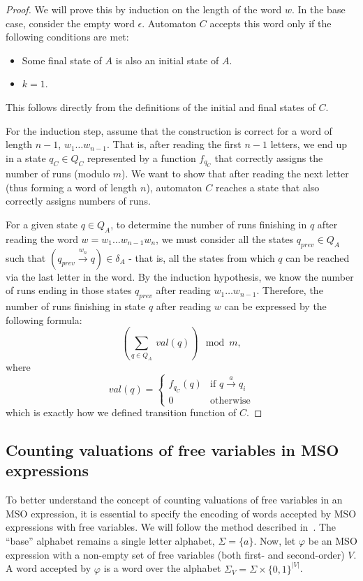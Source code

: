 \documentclass[12pt]{article}
\theoremstyle{definition}
\begin{document}
\begin{proof}
    We will prove this by induction on the length of the word $w$. In the base case, consider the empty word $\epsilon$. Automaton $C$ accepts this word only if the following conditions are met:
    \begin{itemize}
        \item Some final state of $A$ is also an initial state of $A$.
        \item $k = 1$.
    \end{itemize}
    This follows directly from the definitions of the initial and final states of $C$.
    
    For the induction step, assume that the construction is correct for a word of length $n-1$, $w_1 \ldots w_{n-1}$. That is, after reading the first $n-1$ letters, we end up in a state $q_C \in Q_C$ represented by a function $f_{q_C}$ that correctly assigns the number of runs (modulo $m$). We want to show that after reading the next letter (thus forming a word of length $n$), automaton $C$ reaches a state that also correctly assigns numbers of runs. 
    
    For a given state $q \in Q_A$, to determine the number of runs finishing in $q$ after reading the word $w = w_1\ldots w_{n-1}w_n$, we must consider all the states $q_{prev} \in Q_A$ such that $(q_{prev} \xrightarrow{w_n} q) \in \delta_A$ - that is, all the states from which $q$ can be reached via the last letter in the word. By the induction hypothesis, we know the number of runs ending in those states $q_{prev}$ after reading $w_1 \ldots w_{n-1}$. Therefore, the number of runs finishing in state $q$ after reading $w$ can be expressed by the following formula:
    $$(\sum_{q \in Q_A} \ val(q)) \mod m,$$
    where
    \begin{equation*}
        val(q) =
            \begin{cases}
            f_{q_C}(q) & \text{if $q \xrightarrow{a} q_i$} \\
            0 & \text{otherwise}
            \end{cases}       
    \end{equation*}
    which is exactly how we defined transition function of $C$.
\end{proof}

\subsection{Counting valuations of free variables in MSO expressions}

To better understand the concept of counting valuations of free variables in an MSO expression, it is essential to specify the encoding of words accepted by MSO expressions with free variables. We will follow the method described in~\cite{KreutzerR13}. The ``base'' alphabet remains a single letter alphabet, $\Sigma = \{a\}$. Now, let $\varphi$ be an MSO expression with a non-empty set of free variables (both first- and second-order) $V$. A word accepted by $\varphi$ is a word over the alphabet $\Sigma_V = \Sigma \times \{0, 1\}^{|V|}$. 
\end{document}
